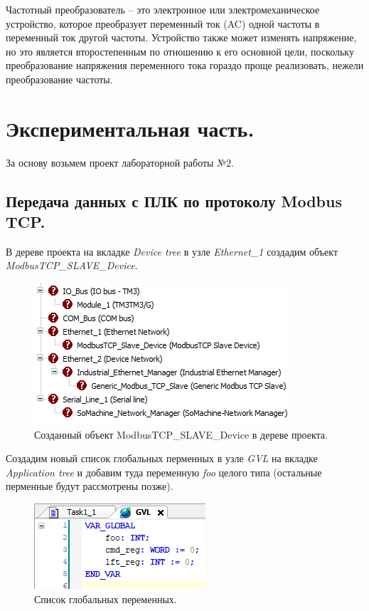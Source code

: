 \documentclass[a4paper, 12pt]{article}
\begin{document}
    Частотный преобразователь – это электронное или
    электромеханическое устройство, которое преобразует переменный ток
    (AC) одной частоты в переменный ток другой частоты. Устройство
    также может изменять напряжение, но это является второстепенным по
    отношению к его основной цели, поскольку преобразование
    напряжения переменного тока гораздо проще реализовать, нежели
    преобразование частоты.


    \section{Экспериментальная часть.}
    За основу возьмем проект лабораторной работы №2.
    
    
    \subsection{Передача данных с ПЛК по протоколу Modbus TCP.}
    В дереве проекта на вкладке \textit{Device tree} в узле
    \textit{Ethernet\_{1}} создадим объект\\\textit{ModbusTCP\_{SLAVE}\_{Device}}.
    \begin{figure}[H]
        \centering
        \includegraphics[scale=1.1]{modbus_tree.png}
        \captionsetup{skip=0pt}
        \caption{Созданный объект ModbusTCP\_{SLAVE}\_{Device} в дереве проекта.}
        \label{fig:mtree}
    \end{figure}


    Создадим новый список глобальных перменных в узле \textit{GVL} на
    вкладке \textit{Application tree} и добавим туда переменную \textit{foo} целого типа (остальные перменные
    будут рассмотрены позже).
    \begin{figure}[H]
        \centering
        \includegraphics[scale=1.5]{global.png}
        \captionsetup{skip=0pt}
        \caption{Список глобальных переменных.}
        \label{fig:gvl}
    \end{figure}
\end{document}
